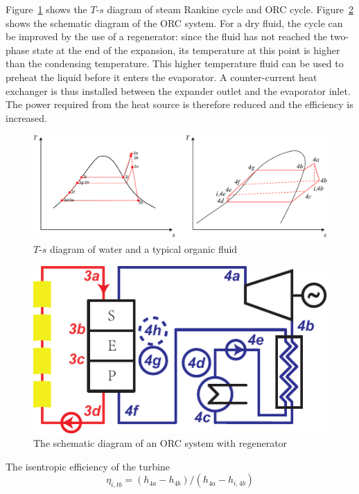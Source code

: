 Figure~\ref{fig:$T$-$s$_2systems} shows the $T$-$s$ diagram of steam Rankine cycle and ORC cycle. Figure~\ref{fig:ORCsystem2} shows the schematic diagram of the ORC system. For a dry fluid, the cycle can be improved by the use of a regenerator: since the fluid has not reached the two-phase state at the end of the expansion, its temperature at this point is higher than the condensing temperature. This higher temperature fluid can be used to preheat the liquid before it enters the evaporator.
A counter-current heat exchanger is thus installed between the expander outlet and the evaporator inlet. The power required from the heat source is therefore reduced and the efficiency is increased.

  \noindent \begin{figure}[htbp]
\begin{center}
	\includegraphics[width = 0.8\columnwidth]{fig/Ts.pdf}
	\caption{$T$-$s$ diagram of water and a typical organic fluid}
	\label{fig:$T$-$s$_2systems}
\end{center}
\end{figure}

\noindent \begin{figure}[htbp]
\begin{center}
	\includegraphics[width = 0.6\columnwidth]{fig/ORCsystem2.pdf}
	\caption{The schematic diagram of an ORC system with regenerator}
	\label{fig:ORCsystem2}
\end{center}
\end{figure}

The isentropic efficiency of the turbine
\begin{equation}
  \eta_{i,tb} = (h_{4a}-h_{4b})/(h_{4a}-h_{i,4b})
\end{equation}

